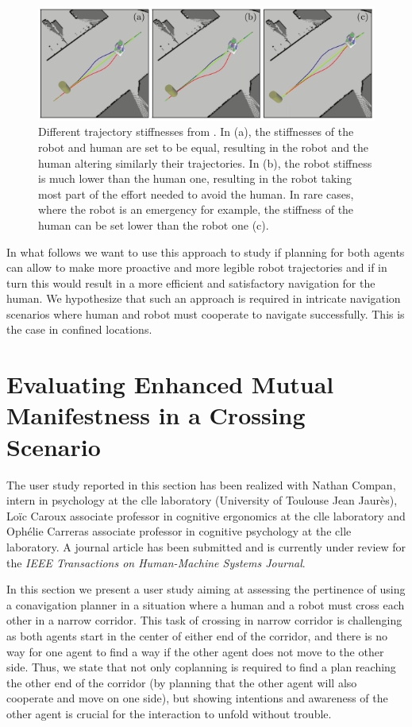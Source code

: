 \documentclass[a4paper,11pt,twoside]{StyleThese}
\begin{document}
\begin{figure}[hbtp]
\centering
\includegraphics[width=\textwidth]{figures/chapter2/hateb_effort.png}
\caption{Different trajectory stiffnesses from \cite{khambhaita_viewing_2017}. In (a), the stiffnesses of the robot and human are set to be equal, resulting in the robot and the human altering similarly their trajectories. In (b), the robot stiffness is much lower than the human one, resulting in the robot taking most part of the effort needed to avoid the human. In rare cases, where the robot is an emergency for example, the stiffness of the human can be set lower than the robot one (c).}
\label{fig:hateb_effort}
\end{figure}

In what follows we want to use this approach to study if planning for both agents can allow to make more proactive and more legible robot trajectories and if in turn this would result in a more efficient and satisfactory navigation for the human. We hypothesize that such an approach is required in intricate navigation scenarios where human and robot must cooperate to navigate successfully. This is the case in confined locations.

\section{Evaluating Enhanced Mutual Manifestness in a Crossing Scenario}

The user study reported in this section has been realized with Nathan Compan, intern in psychology at the \acrfull{clle} laboratory (University of Toulouse Jean Jaurès), Lo\"ic Caroux associate professor in cognitive ergonomics at the \acrshort{clle} laboratory and Ophélie Carreras associate professor in cognitive psychology at the \acrshort{clle} laboratory. A journal article has been submitted and is currently under review for the \textit{IEEE Transactions on Human-Machine Systems Journal}.

In this section we present a user study aiming at assessing the pertinence of using a conavigation planner in a situation where a human and a robot must cross each other in a narrow corridor. This task of crossing in narrow corridor is challenging as both agents start in the center of either end of the corridor, and there is no way for one agent to find a way if the other agent does not move to the other side. Thus, we state that not only coplanning is required to find a plan reaching the other end of the corridor (by planning that the other agent will also cooperate and move on one side), but showing intentions and awareness of the other agent is crucial for the interaction to unfold without trouble.
\end{document}
